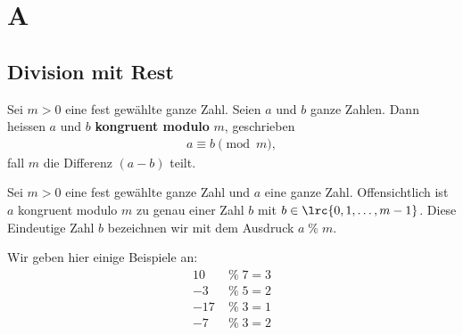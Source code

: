 \chapter{A}\label{ch:AppendixA}

\section{Division mit Rest}\label{sec:DivisionMitRest}
\begin{mydefinition}
Sei $m > 0$ eine fest gewählte ganze Zahl. Seien $a$ und $b$ ganze Zahlen. Dann heissen $a$ und $b$ \textbf{kongruent modulo} $m$, geschrieben
\begin{align*}
	a \equiv b \pmod{m},
\end{align*}
fall $m$ die Differenz $(a - b)$ teilt.
\end{mydefinition}

\begin{mydefinition}
Sei $m > 0$ eine fest gewählte ganze Zahl und $a$ eine ganze Zahl. Offensichtlich ist $a$ kongruent modulo $m$ zu genau einer Zahl $b$ mit $b\in\lrc{0, 1, \ldots, m-1}$. Diese Eindeutige Zahl $b$ bezeichnen wir mit dem Ausdruck $a\; \% \; m$.
\end{mydefinition}

\begin{myexample}
Wir geben hier einige Beispiele an:
\begin{align*}
	10 \; & \% \; 7 = 3 \\
	-3 \; & \% \; 5 = 2 \\
	-17\; & \% \; 3 = 1 \\
	-7 \; & \% \; 3 = 2
\end{align*}
\end{myexample}

